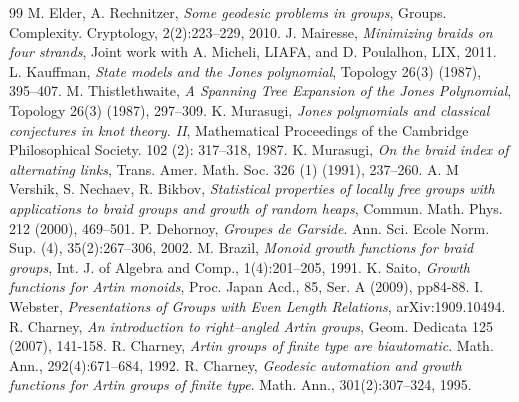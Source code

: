 \documentclass[11pt]{amsart}
\theoremstyle{plain}
\theoremstyle{definition}
\numberwithin{equation}{section}
\begin{document}
\begin{thebibliography}{99}
 M. Elder, A. Rechnitzer, {\it Some geodesic problems in groups}, Groups. Complexity. Cryptology, 2(2):223–229, 2010.
 J. Mairesse, {\it Minimizing braids on four strands}, Joint work with A. Micheli, LIAFA, and D. Poulalhon, LIX, 2011.
 L. Kauffman, {\it State models and the Jones polynomial}, Topology 26(3) (1987), 395–407.
 M. Thistlethwaite, {\it A Spanning Tree Expansion of the Jones Polynomial}, Topology 26(3) (1987), 297–309.
 K. Murasugi, {\it Jones polynomials and classical conjectures in knot theory. II}, Mathematical Proceedings of the Cambridge Philosophical Society. 102 (2): 317–318, 1987.
 K. Murasugi, {\it On the braid index of alternating links}, Trans. Amer. Math. Soc. 326 (1) (1991), 237–260.
 A. M Vershik, S. Nechaev, R. Bikbov, {\it Statistical properties of locally free groups with applications to braid groups and growth of random heaps}, Commun. Math. Phys. 212 (2000), 469–501.
 P. Dehornoy, {\it Groupes de Garside}. Ann. Sci. Ecole Norm. Sup. (4), 35(2):267–306, 2002.
 M. Brazil, {\it Monoid growth functions for braid groups}, Int. J. of Algebra and Comp., 1(4):201–205, 1991.
 K. Saito, {\it Growth functions for Artin monoids}, Proc. Japan Acd., 85, Ser. A (2009), pp84-88.
 I. Webster, {\it Presentations of Groups with Even Length Relations}, arXiv:1909.10494.
 R. Charney, {\it An introduction to right--angled Artin groups}, Geom. Dedicata 125 (2007), 141-158.
 R. Charney, {\it Artin groups of finite type are biautomatic}. Math. Ann., 292(4):671–684, 1992.
 R. Charney, {\it Geodesic automation and growth functions for Artin groups of finite type}. Math. Ann., 301(2):307–324, 1995.
\end{thebibliography}
\end{document}
